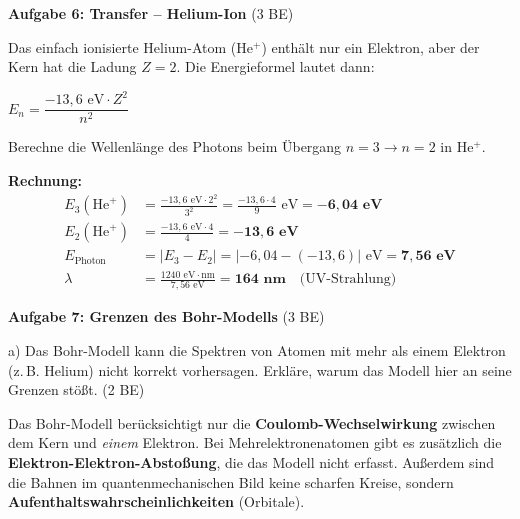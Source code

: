 \documentclass[11pt,a4paper]{article}
\begin{document}
\vspace{0.5em}


\textbf{Aufgabe 6: Transfer -- Helium-Ion} \hfill (3 BE)

\vspace{0.3em}

Das einfach ionisierte Helium-Atom (He$^+$) enthält nur ein Elektron, aber der Kern hat die Ladung $Z = 2$. Die Energieformel lautet dann:

\begin{center}
$E_n = \dfrac{-13{,}6 \text{ eV} \cdot Z^2}{n^2}$
\end{center}

Berechne die Wellenlänge des Photons beim Übergang $n = 3 \to n = 2$ in He$^+$.

\begin{tcolorbox}[loesungbox]
\textbf{Rechnung:}
\begin{align*}
E_3(\text{He}^+) &= \frac{-13{,}6 \text{ eV} \cdot 2^2}{3^2} = \frac{-13{,}6 \cdot 4}{9} \text{ eV} = \mathbf{-6{,}04 \text{ eV}} \\[0.3em]
E_2(\text{He}^+) &= \frac{-13{,}6 \text{ eV} \cdot 4}{4} = \mathbf{-13{,}6 \text{ eV}} \\[0.3em]
E_{\text{Photon}} &= |E_3 - E_2| = |-6{,}04 - (-13{,}6)| \text{ eV} = \mathbf{7{,}56 \text{ eV}} \\[0.3em]
\lambda &= \frac{1240 \text{ eV} \cdot \text{nm}}{7{,}56 \text{ eV}} = \mathbf{164 \text{ nm}} \quad \text{(UV-Strahlung)}
\end{align*}
\end{tcolorbox}

\vspace{0.5em}


\textbf{Aufgabe 7: Grenzen des Bohr-Modells} \hfill (3 BE)

\vspace{0.3em}

a) Das Bohr-Modell kann die Spektren von Atomen mit mehr als einem Elektron (z.\,B. Helium) nicht korrekt vorhersagen. Erkläre, warum das Modell hier an seine Grenzen stößt. (2 BE)

\begin{tcolorbox}[loesungbox]
Das Bohr-Modell berücksichtigt nur die \textbf{Coulomb-Wechselwirkung} zwischen dem Kern und \emph{einem} Elektron. Bei Mehrelektronenatomen gibt es zusätzlich die \textbf{Elektron-Elektron-Abstoßung}, die das Modell nicht erfasst. Außerdem sind die Bahnen im quantenmechanischen Bild keine scharfen Kreise, sondern \textbf{Aufenthaltswahrscheinlichkeiten} (Orbitale).
\end{tcolorbox}
\end{document}
